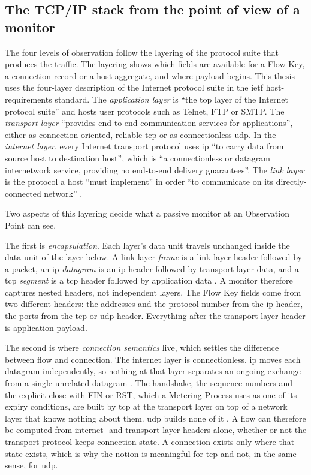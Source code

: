 \subsection{The TCP/IP stack from the point of view of a monitor}
\label{sec:tcpip-stack-monitor-view}

The four levels of observation follow the layering of the protocol suite
that produces the traffic. The layering shows which fields are
available for a Flow Key, a connection record or a host aggregate, and where
payload begins. This thesis uses the four-layer description of the Internet
protocol suite in the \gls{ietf} host-requirements standard. The
\emph{application layer} is ``the top layer of the Internet protocol suite''
and hosts user protocols such as Telnet, FTP or SMTP. The \emph{transport
layer} ``provides end-to-end communication services for applications'',
either as connection-oriented, reliable \gls{tcp} or as connectionless
\gls{udp}. In the \emph{internet layer}, every Internet transport protocol
uses \gls{ip} ``to carry data from source host to destination host'', which
is ``a connectionless or datagram internetwork service, providing no
end-to-end delivery guarantees''. The \emph{link layer} is the protocol a
host ``must implement'' in order ``to communicate on its directly-connected
network'' \citep{braden1989rfc1122}.

Two aspects of this layering decide what a passive monitor at an
Observation Point can see.

The first is \emph{encapsulation}. Each layer's data unit travels unchanged
inside the data unit of the layer below. A link-layer \emph{frame} is a
link-layer header followed by a packet, an \gls{ip} \emph{datagram} is an
\gls{ip} header followed by transport-layer data, and a \gls{tcp}
\emph{segment} is a \gls{tcp} header followed by application data
\citep{braden1989rfc1122}. A monitor therefore captures nested headers, not
independent layers. The Flow Key fields come from two different headers: the
addresses and the protocol number from the \gls{ip} header, the ports from
the \gls{tcp} or \gls{udp} header. Everything after the transport-layer
header is application payload.

The second is where \emph{connection semantics} live, which settles the
difference between flow and connection. The internet layer is connectionless.
\gls{ip} moves each datagram independently, so nothing at that layer
separates an ongoing exchange from a single unrelated datagram
\citep{braden1989rfc1122}. The handshake, the sequence numbers and the
explicit close with FIN or RST, which a Metering Process uses as one of its
expiry conditions, are built by \gls{tcp} at the transport layer on top of a
network layer that knows nothing about them. \gls{udp} builds none of it
\citep{braden1989rfc1122}. A flow can therefore be computed from internet-
and transport-layer headers alone, whether or not the transport protocol
keeps connection state. A connection exists only where that state exists,
which is why the notion is meaningful for \gls{tcp} and not, in the same
sense, for \gls{udp}.

